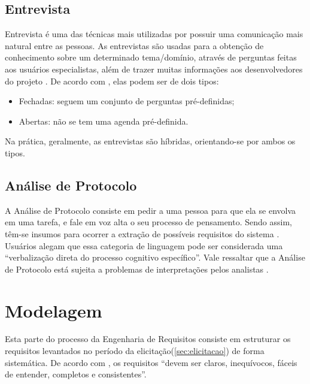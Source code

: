 \subsection{Entrevista}

\label{sec:entrevista}

Entrevista é uma das técnicas mais utilizadas por possuir uma comunicação mais natural entre as pessoas. As entrevistas são usadas para a obtenção de conhecimento sobre um determinado tema/domínio, através de perguntas feitas aos usuários especialistas, além de trazer muitas informações aos desenvolvedores do projeto \cite{batista2003taxonomia}. De acordo com \cite{Sommerville10}, elas podem ser de dois tipos:
\begin{itemize}
    \item Fechadas: seguem um conjunto de perguntas pré-definidas;
    \item Abertas: não se tem uma agenda pré-definida.
\end{itemize}
Na prática, geralmente, as entrevistas são híbridas, orientando-se por ambos os tipos.

\subsection{Análise de Protocolo}

\label{sec:analise-protocolo}

A Análise de Protocolo consiste em pedir a uma pessoa para que ela se envolva em uma tarefa, e fale em voz alta o seu processo de pensamento. Sendo assim, têm-se insumos para ocorrer a extração de possíveis requisitos do sistema \cite{goguen1993techniques}. Usuários alegam que essa categoria de linguagem pode ser considerada uma “verbalização direta do processo cognitivo específico”. Vale ressaltar que a Análise de Protocolo está sujeita a problemas de interpretações pelos analistas \cite{belgamo2000estudo}.

\section {Modelagem}

\label{sec:modelagem}

Esta parte do processo da Engenharia de Requisitos consiste em estruturar os requisitos levantados no período da elicitação(\ref{sec:elicitacao}) de forma sistemática. De acordo com \cite{Sommerville10}, os requisitos “devem ser claros, inequívocos, fáceis de entender, completos e consistentes”.

